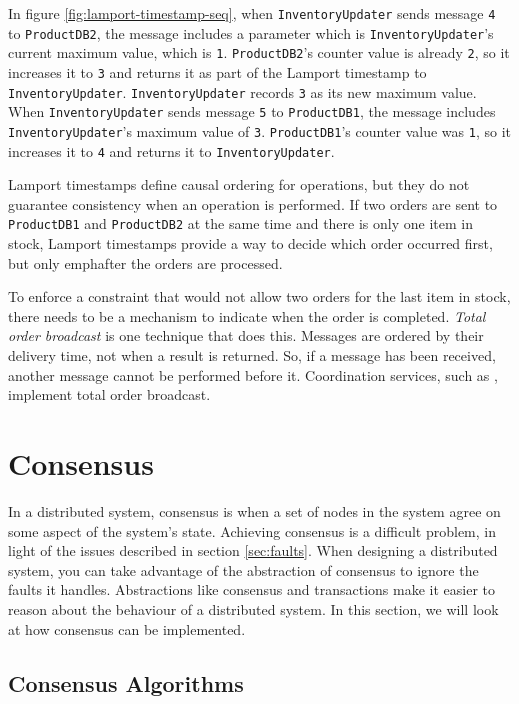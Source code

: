In figure \ref{fig:lamport-timestamp-seq}, when \texttt{InventoryUpdater} sends message \texttt{4} to \texttt{ProductDB2},
the message includes a parameter which is \texttt{InventoryUpdater}'s current maximum value, which is \texttt{1}.
\texttt{ProductDB2}'s counter value is already \texttt{2},
so it increases it to \texttt{3} and returns it as part of the Lamport timestamp to \texttt{InventoryUpdater}.
\texttt{InventoryUpdater} records \texttt{3} as its new maximum value.
When \texttt{InventoryUpdater} sends message \texttt{5} to \texttt{ProductDB1},
the message includes \texttt{InventoryUpdater}'s maximum value of \texttt{3}.
\texttt{ProductDB1}'s counter value was \texttt{1}, so it increases it to \texttt{4} and returns it to \texttt{InventoryUpdater}.

Lamport timestamps define causal ordering for operations, but they do not guarantee consistency when an operation is performed.
If two orders are sent to \texttt{ProductDB1} and \texttt{ProductDB2} at the same time and there is only one item in stock,
Lamport timestamps provide a way to decide which order occurred first, but only emph{after} the orders are processed.

To enforce a constraint that would not allow two orders for the last item in stock,
there needs to be a mechanism to indicate when the order is completed.
\emph{Total order broadcast} is one technique that does this.
Messages are ordered by their delivery time, not when a result is returned.
So, if a message has been received, another message cannot be performed before it.
Coordination services, such as , implement total order broadcast.


\section{Consensus}\label{sec:consensus}

In a distributed system, consensus is when a set of nodes in the system agree on some aspect of the system's state.
Achieving consensus is a difficult problem, in light of the issues described in section \ref{sec:faults}.
When designing a distributed system, you can take advantage of the abstraction of consensus to ignore the faults it handles.
Abstractions like consensus and transactions \cite{distributed2-notes} make it easier to reason about the behaviour of a distributed system.
In this section, we will look at how consensus can be implemented.

\subsection{Consensus Algorithms}

